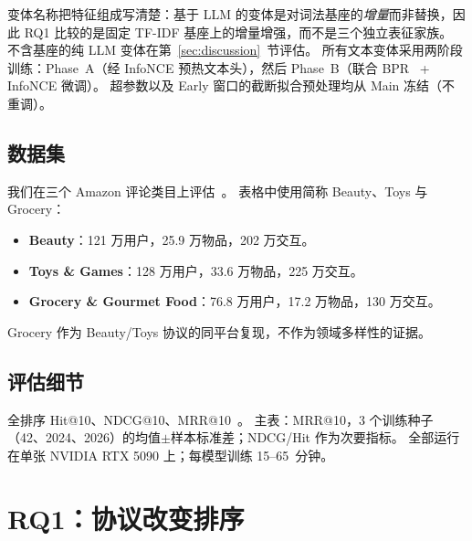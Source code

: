 \documentclass[sigconf,natbib=true,anonymous]{acmart}
\newcommand{\tfidf}{\textsc{TF-IDF}\xspace}
\begin{document}
变体名称把特征组成写清楚：基于 LLM 的变体是对词法基座的\emph{增量}而非替换，因此 RQ1 比较的是固定 \tfidf 基座上的增量增强，而不是三个独立表征家族。
不含基座的纯 LLM 变体在第~\ref{sec:discussion}~节评估。
所有文本变体采用两阶段训练：Phase~A（经 InfoNCE 预热文本头），然后 Phase~B（联合 BPR~\cite{rendle2009bpr} + InfoNCE 微调）。
超参数以及 Early 窗口的截断拟合预处理均从 Main 冻结（不重调）。

\subsection{数据集}

我们在三个 Amazon 评论类目上评估~\cite{mcauley2015amazon,ni2019amazon}。
表格中使用简称 Beauty、Toys 与 Grocery：
\begin{itemize}[leftmargin=*,itemsep=1pt]
\item \textbf{Beauty}：121 万用户，25.9 万物品，202 万交互。
\item \textbf{Toys \& Games}：128 万用户，33.6 万物品，225 万交互。
\item \textbf{Grocery \& Gourmet Food}：76.8 万用户，17.2 万物品，130 万交互。
\end{itemize}
Grocery 作为 Beauty/Toys 协议的同平台复现，不作为领域多样性的证据。

\subsection{评估细节}

全排序 Hit@10、NDCG@10、MRR@10~\cite{krichene2020sampledmetrics}。
主表：MRR@10，3 个训练种子（42、2024、2026）的均值$\pm$样本标准差；NDCG/Hit 作为次要指标。
全部运行在单张 NVIDIA RTX 5090 上；每模型训练 15--65~分钟。

\section{RQ1：协议改变排序}
\label{sec:rq1}
\end{document}
